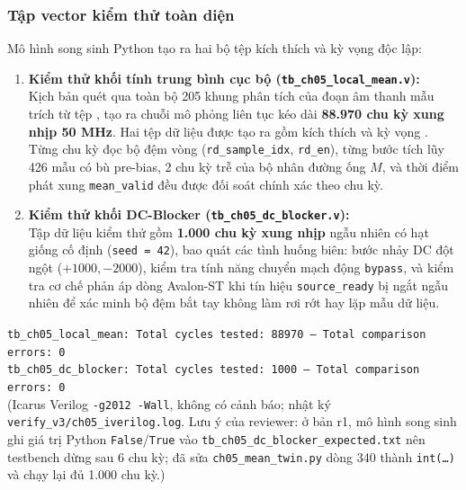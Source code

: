 \subsubsection*{Tập vector kiểm thử toàn diện}
Mô hình song sinh Python tạo ra hai bộ tệp kích thích và kỳ vọng độc lập:
\begin{enumerate}[leftmargin=1.5em, itemsep=2pt]
    \item \textbf{Kiểm thử khối tính trung bình cục bộ (\texttt{tb\_ch05\_local\_mean.v}):}\\
    Kịch bản quét qua toàn bộ 205 khung phân tích của đoạn âm thanh mẫu trích từ tệp , tạo ra chuỗi mô phỏng liên tục kéo dài \textbf{88.970 chu kỳ xung nhịp 50 MHz}. Hai tệp dữ liệu được tạo ra gồm kích thích  và kỳ vọng . Từng chu kỳ đọc bộ đệm vòng (\texttt{rd\_sample\_idx}, \texttt{rd\_en}), từng bước tích lũy 426 mẫu có bù pre-bias, 2 chu kỳ trễ của bộ nhân đường ống $M$, và thời điểm phát xung \texttt{mean\_valid} đều được đối soát chính xác theo chu kỳ.
    \item \textbf{Kiểm thử khối DC-Blocker (\texttt{tb\_ch05\_dc\_blocker.v}):}\\
    Tập dữ liệu kiểm thử gồm \textbf{1.000 chu kỳ xung nhịp} ngẫu nhiên có hạt giống cố định (\texttt{seed = 42}), bao quát các tình huống biên: bước nhảy DC đột ngột ($+1000, -2000$), kiểm tra tính năng chuyển mạch động \texttt{bypass}, và kiểm tra cơ chế phản áp dòng Avalon-ST khi tín hiệu \texttt{source\_ready} bị ngắt ngẫu nhiên để xác minh bộ đệm bắt tay không làm rơi rớt hay lặp mẫu dữ liệu.
\end{enumerate}

\begin{tcolorbox}[colback=yellow!10!white,colframe=yellow!50!black,title={Kết quả chạy Icarus Verilog chu kỳ-đối-chu kỳ (Reviewer)}]
\small\texttt{tb\_ch05\_local\_mean: Total cycles tested: 88970 -- Total comparison errors: 0}\\
\small\texttt{tb\_ch05\_dc\_blocker: Total cycles tested: 1000 -- Total comparison errors: 0}\\
\footnotesize(Icarus Verilog \texttt{-g2012 -Wall}, không có cảnh báo; nhật ký \texttt{verify\_v3/ch05\_iverilog.log}. Lưu ý của reviewer: ở bản r1, mô hình song sinh ghi giá trị Python \texttt{False}/\texttt{True} vào \texttt{tb\_ch05\_dc\_blocker\_expected.txt} nên testbench dừng sau 6 chu kỳ; đã sửa \texttt{ch05\_mean\_twin.py} dòng 340 thành \texttt{int(\dots)} và chạy lại đủ 1.000 chu kỳ.)
\end{tcolorbox}

